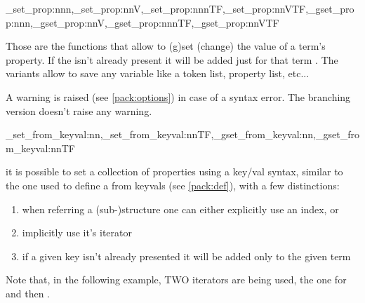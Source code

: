 \documentclass[10pt]{article}
\begin{document}
\begin{codedescribe}{\starray_set_prop:nnn,\starray_set_prop:nnV,\starray_set_prop:nnnTF,\starray_set_prop:nnVTF,\starray_gset_prop:nnn,\starray_gset_prop:nnV,\starray_gset_prop:nnnTF,\starray_gset_prop:nnVTF}
\begin{codesyntax}%
\end{codesyntax}
\end{codedescribe}
Those are the functions that allow to (g)set (change) the value of a term's property. If the  isn't already present it will be added just for that term . The  variants allow to save any variable like a token list, property list, etc...
\begin{tsremark}
A warning is raised (see \ref{pack:options}) in case of a  syntax error. The branching version doesn't raise any warning.
\end{tsremark}

\begin{codedescribe}{\starray_set_from_keyval:nn,\starray_set_from_keyval:nnTF,\starray_gset_from_keyval:nn,\starray_gset_from_keyval:nnTF}
\begin{codesyntax}%
\end{codesyntax}
it is possible to set a collection of properties using a key/val syntax, similar to the one used to define a  from keyvals (see \ref{pack:def}), with a few distinctions:
\begin{enumerate}
  \item when referring a (sub-)structure one can either explicitly use an index, or
  \item  implicitly use it's iterator 
  \item if a given key isn't already presented it will be added only to the given term
\end{enumerate}
 Note that, in the following example, TWO iterators are being used, the one for  and then .
\end{codedescribe}
\end{document}

